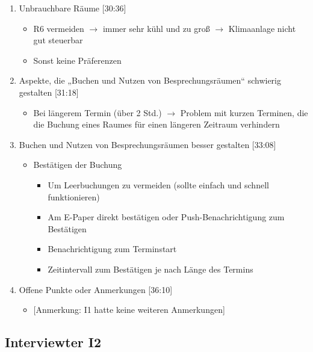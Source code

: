 \begin{enumerate}
    \item Unbrauchbare Räume [30:36]
    \begin{itemize}
        \item R6 vermeiden $\rightarrow$ immer sehr kühl und zu groß $\rightarrow$ Klimaanlage nicht gut steuerbar
        \item Sonst keine Präferenzen
    \end{itemize}
        
    \item Aspekte, die „Buchen und Nutzen von Besprechungsräumen“ schwierig gestalten [31:18]
    \begin{itemize}
        \item Bei längerem Termin (über 2 Std.) $\rightarrow$ Problem mit kurzen Terminen, die die Buchung eines Raumes für einen längeren Zeitraum verhindern
    \end{itemize}

    \item Buchen und Nutzen von Besprechungsräumen besser gestalten [33:08]
    \begin{itemize}
        \item Bestätigen der Buchung
        \begin{itemize}
            \item Um Leerbuchungen zu vermeiden (sollte einfach und schnell funktionieren)
            \item Am E-Paper direkt bestätigen oder Push-Benachrichtigung zum Bestätigen
            \item Benachrichtigung zum Terminstart 
            \item Zeitintervall zum Bestätigen je nach Länge des Termins 
        \end{itemize}
    \end{itemize}
        
    \item Offene Punkte oder Anmerkungen [36:10]
    \begin{itemize}
        \item{} [Anmerkung: I1 hatte keine weiteren Anmerkungen]
    \end{itemize}

\end{enumerate}

\clearpage
\subsection{Interviewter I2}
\label{subsec:interview-i2}

